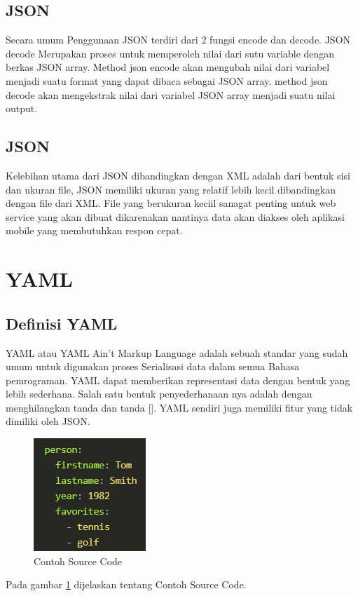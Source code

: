 \documentclass[a4paper]{article}
\begin{document}
\subsection{JSON}
Secara umum Penggunaan JSON terdiri dari 2 fungsi encode dan decode.  JSON decode Merupakan proses untuk  memperoleh nilai dari sutu variable dengan berkas JSON array. Method json encode akan mengubah nilai dari variabel  menjadi suatu format yang dapat dibaca sebagai JSON array. method json decode  akan mengekstrak nilai dari variabel JSON array  menjadi suatu nilai output.
\subsection{JSON}
Kelebihan utama dari JSON dibandingkan dengan XML adalah dari bentuk sisi dan ukuran file, JSON memiliki ukuran yang relatif  lebih kecil dibandingkan dengan file dari XML. File yang berukuran keciil sanagat penting untuk web service yang akan dibuat dikarenakan nantinya data akan diakses oleh aplikasi mobile yang membutuhkan respon cepat.
\section{YAML}
\subsection{Definisi YAML}
YAML atau YAML Ain't Markup Language adalah sebuah standar yang sudah umum untuk digunakan proses Serialisasi data dalam semua Bahasa pemrograman. YAML dapat memberikan representasi data dengan bentuk yang lebih sederhana. Salah satu bentuk penyederhanaan nya adalah dengan menghilangkan tanda {} dan tanda []. YAML sendiri juga memiliki fitur yang tidak dimiliki oleh JSON.
\begin{figure}[ht]
\centerline{\includegraphics[scale=1]{../figures/5SC.png} }

\caption{Contoh Source Code} 
\label{Sc}
\end{figure}

Pada gambar \ref{Sc} dijelaskan tentang Contoh Source Code.
\end{document}
